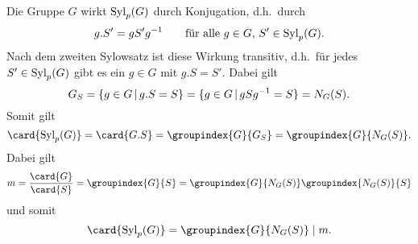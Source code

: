 \subsection{}

Die Gruppe $G$ wirkt $\operatorname{Syl}_{p}(G)$ durch Konjugation, d.h.\ durch
\[
    g.S'
  = g S' g^{-1}
  \qquad
  \text{für alle $g \in G$, $S' \in \operatorname{Syl}_{p}(G)$}.
\]
Nach dem zweiten Sylowsatz ist diese Wirkung transitiv, d.h.\ für jedes $S' \in \operatorname{Syl}_{p}(G)$ gibt es ein $g \in G$ mit $g.S = S'$.
Dabei gilt
\[
    G_S
  = \{ g \in G \suchthat g.S = S \}
  = \{ g \in G \suchthat g S g^{-1} = S \}
  = \normalizer{S}{G}.
\]
Somit gilt
\[
    \card{\Sylow{p}{G}}
  = \card{G.S}
  = \groupindex{G}{G_S}
  = \groupindex{G}{\normalizer{S}{G}}.
\]
Dabei gilt
\[
    m
  = \frac{\card{G}}{\card{S}}
  = \groupindex{G}{S}
  = \groupindex{G}{\normalizer{S}{G}} \groupindex{\normalizer{S}{G}}{S}
\]
und somit
\[
            \card{\Sylow{p}{G}}
  =         \groupindex{G}{\normalizer{S}{G}}
  \divides  m.
\]
